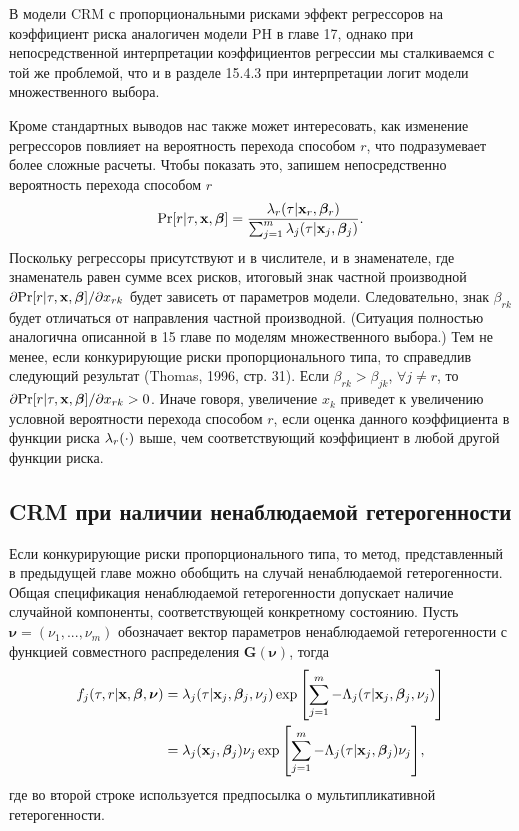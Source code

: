 \noindent
В модели CRM с пропорциональными рисками эффект регрессоров на коэффициент риска аналогичен модели PH в главе 17, %
однако при непосредственной интерпретации коэффициентов регрессии мы сталкиваемся с той же проблемой, что и в разделе 15.4.3 %
при интерпретации логит модели множественного выбора. %

Кроме стандартных выводов нас также может интересовать, как изменение регрессоров повлияет на вероятность перехода способом $r$, что подразумевает более сложные расчеты. Чтобы показать это, запишем непосредственно вероятность перехода способом $r$
    \begin{align}\label{eq:19.12}
    \mathrm{Pr} [r|\tau,\mathbf{x},\bm{\beta}] = \frac{\lambda_r(\tau|\mathbf{x}_r,\bm{\beta}_r)}{\sum^{m}_{j=1} \lambda_j(\tau|\mathbf{x}_j,\bm{\beta}_j)}.
    \end{align}
Поскольку регрессоры присутствуют и в числителе, и в знаменателе, где знаменатель равен сумме всех рисков, итоговый знак частной производной $\partial\mathrm{Pr}[r|\tau, \mathbf{x}, \bm{\beta}] / \partial x_{rk}$ будет зависеть от параметров модели. Следовательно, знак $\beta_{rk}$ будет отличаться от направления частной производной. (Ситуация полностью аналогична описанной в 15 %
главе по моделям множественного выбора.) Тем не менее, если конкурирующие риски пропорционального типа, то справедлив следующий результат (Thomas, 1996, стр. 31). Если $\beta_{rk} > \beta_{jk}$, $\forall j \ne r$, то $\partial \mathrm{Pr}[r | \tau, \mathbf{x}, \bm{\beta}] / \partial x_{rk} > 0$. Иначе говоря, увеличение $x_k$ приведет к увеличению условной вероятности перехода способом $r$, если оценка данного коэффициента в функции риска $\lambda_r(\cdot)$ выше, чем соответствующий коэффициент в любой другой функции риска.


\subsection{CRM при наличии ненаблюдаемой гетерогенности}\label{sec:19.2.5}

\noindent
Если конкурирующие риски пропорционального типа, то метод, представленный в предыдущей главе можно обобщить на случай ненаблюдаемой гетерогенности. Общая спецификация ненаблюдаемой гетерогенности допускает наличие случайной компоненты, соответствующей конкретному состоянию. Пусть $\bm{\nu} = (\nu_1, ..., \nu_m)$ обозначает вектор параметров ненаблюдаемой гетерогенности с функцией совместного распределения $\bm{G}(\bm{\nu})$, тогда
    \begin{align}
    f_j(\tau,r| \mathbf{x}, \bm{\beta}, \bm{\nu}) &= \lambda_j(\tau|\mathbf{x}_j,\bm{\beta}_j,\nu_j) \exp{\left[ \sum^{m}_{j=1} -\Lambda_j(\tau|\mathbf{x}_j,\bm{\beta}_j,\nu_j) \right]} \notag \\
    &= \lambda_j(\mathbf{x}_j,\bm{\beta}_j)\nu_j \exp{\left[ \sum^{m}_{j=1} -\Lambda_j(\tau|\mathbf{x}_j,\bm{\beta}_j)\nu_j \right]}, \notag
    \end{align}
где во второй строке используется предпосылка о мультипликативной гетерогенности.

